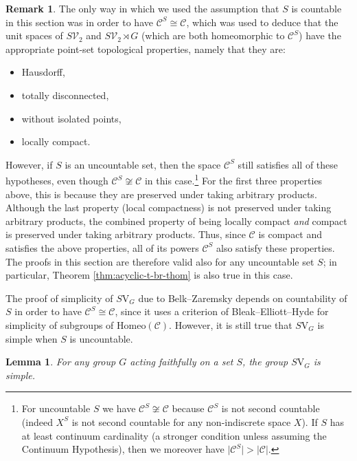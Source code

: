 \documentclass[10pt,a4paper]{amsart}
\numberwithin{equation}{section}
\numberwithin{figure}{section}
\newtheorem{lem}[thm]{Lemma}
\theoremstyle{definition}
\newtheorem{rem}[thm]{Remark}
\newcommand{\cC}{\mathcal{C}}
\newcommand{\cV}{\mathcal{V}}
\newcommand{\V}{\mathrm{V}}
\begin{document}
\begin{rem}
\label{rmk:uncountable-S}
The only way in which we used the assumption that $S$ is countable in this section was in order to have $\cC^S \cong \cC$, which was used to deduce that the unit spaces of $S\cV_2$ and $S\cV_2 \rtimes G$ (which are both homeomorphic to $\cC^S$) have the appropriate point-set topological properties, namely that they are:
\begin{itemize}
    \item Hausdorff,
    \item totally disconnected,
    \item without isolated points,
    \item locally compact.
\end{itemize}
However, if $S$ is an uncountable set, then the space $\cC^S$ still satisfies all of these hypotheses, even though $\cC^S \not\cong \cC$ in this case.\footnote{For uncountable $S$ we have $\cC^S \not\cong \cC$ because $\cC^S$ is not second countable (indeed $X^S$ is not second countable for any non-indiscrete space $X$). If $S$ has at least continuum cardinality (a stronger condition unless assuming the Continuum Hypothesis), then we moreover have $\lvert \cC^S \rvert > \lvert \cC \rvert$.} For the first three properties above, this is because they are preserved under taking arbitrary products. Although the last property (local compactness) is not preserved under taking arbitrary products, the combined property of being locally compact \emph{and} compact is preserved under taking arbitrary products. Thus, since $\cC$ is compact and satisfies the above properties, all of its powers $\cC^S$ also satisfy these properties. The proofs in this section are therefore valid also for any uncountable set $S$; in particular, Theorem \ref{thm:acyclic-t-br-thom} is also true in this case.

The proof of simplicity of $S\V_G$ due to Belk--Zaremsky \cite[Theorem 3.4]{BelkZaremsky22} depends on countability of $S$ in order to have $\cC^S \cong \cC$, since it uses a criterion of Bleak--Elliott--Hyde \cite[Theorem 4.18]{BleakElliottHyde2024} for simplicity of subgroups of $\mathrm{Homeo}(\cC)$. However, it is still true that $S\V_G$ is simple when $S$ is uncountable.
\end{rem}

\begin{lem}
\label{lem:SVG-simple}
For any group $G$ acting faithfully on a set $S$, the group $S\V_G$ is simple.
\end{lem}
\end{document}
